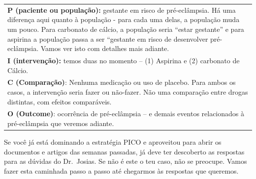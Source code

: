 \documentclass[
  letterpaper,
  DIV=11,
  numbers=noendperiod]{scrreprt}
\begin{document}
\begin{longtable}[]{@{}
  >{\raggedright\arraybackslash}p{}@{}}
\toprule\noalign{}
\endhead
\bottomrule\noalign{}
\endlastfoot
\textbf{P (paciente ou população):} gestante em risco de pré-eclâmpsia.
Há uma diferença aqui quanto à população - para cada uma delas, a
população muda um pouco. Para carbonato de cálcio, a população seria
``estar gestante'' e para aspirina a população passa a ser ``gestante em
risco de desenvolver pré-eclâmpsia. Vamos ver isto com detalhes mais
adiante. \\
\textbf{I (intervenção):} temos duas no momento -- (1) Aspirina e (2)
carbonato de Cálcio. \\
\textbf{C (Comparação)}: Nenhuma medicação ou uso de placebo. Para ambos
os casos, a intervenção seria fazer ou não-fazer. Não uma comparação
entre drogas distintas, com efeitos comparáveis. \\
\textbf{O (Outcome)}: ocorrência de pré-eclâmpsia -- e demais eventos
relacionados à pré-eclâmpsia que veremos adiante. \\
\end{longtable}

Se você já está dominando a estratégia PICO e aproveitou para abrir os
documentos e artigos das semanas passadas, já deve ter descoberto as
respostas para as dúvidas do Dr.~Josias. Se não é este o teu caso, não
se preocupe. Vamos fazer esta caminhada passo a passo até chegarmos às
respostas que queremos.
\end{document}
